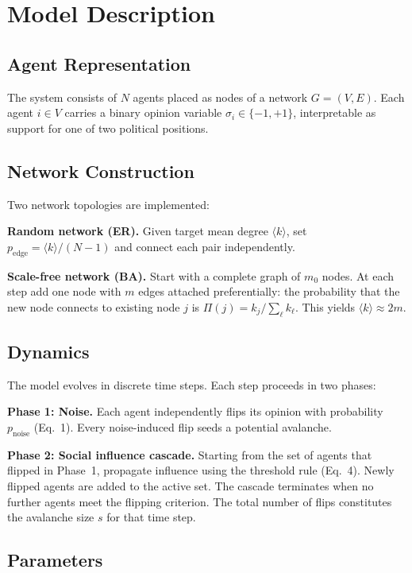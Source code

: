 \documentclass[11pt,twocolumn]{article}
\begin{document}
\section{Model Description}

\subsection{Agent Representation}

The system consists of $N$ agents placed as nodes of a network $G = (V, E)$. Each agent $i \in V$ carries a binary opinion variable $\sigma_i \in \{-1, +1\}$, interpretable as support for one of two political positions.

\subsection{Network Construction}

Two network topologies are implemented:

\textbf{Random network (ER).} Given target mean degree $\langle k \rangle$, set $p_{\text{edge}} = \langle k \rangle / (N-1)$ and connect each pair independently.

\textbf{Scale-free network (BA).} Start with a complete graph of $m_0$ nodes. At each step add one node with $m$ edges attached preferentially: the probability that the new node connects to existing node $j$ is $\Pi(j) = k_j / \sum_\ell k_\ell$. This yields $\langle k \rangle \approx 2m$.

\subsection{Dynamics}

The model evolves in discrete time steps. Each step proceeds in two phases:

\textbf{Phase 1: Noise.} Each agent independently flips its opinion with probability $p_{\text{noise}}$ (Eq.~1). Every noise-induced flip seeds a potential avalanche.

\textbf{Phase 2: Social influence cascade.} Starting from the set of agents that flipped in Phase~1, propagate influence using the threshold rule (Eq.~4). Newly flipped agents are added to the active set. The cascade terminates when no further agents meet the flipping criterion. The total number of flips constitutes the avalanche size $s$ for that time step.

\subsection{Parameters}
\end{document}
